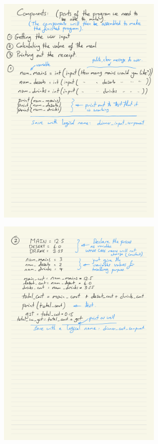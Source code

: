 \documentclass[a4paper,12pt]{article}
\begin{document}
\begin{figure} [!h]
	\centering
	\includegraphics[width=8cm]{iterative_processes/Components_detailed_p1.pdf}
\end{figure}
\begin{figure} [!h]
	\centering
	\includegraphics[width=8cm]{iterative_processes/Components_detailed_p2.pdf}
\end{figure}
\end{document}
